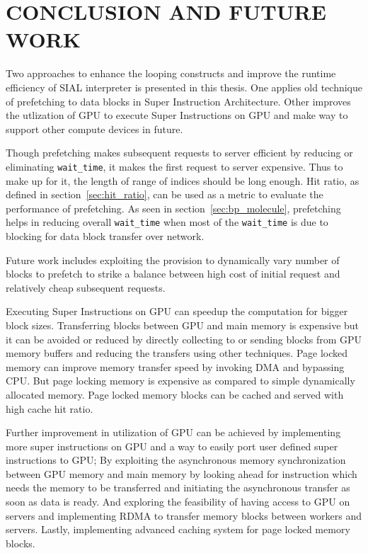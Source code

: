 \chapter{CONCLUSION AND FUTURE WORK}\label{conclusion}
Two approaches to enhance the looping constructs and improve the runtime efficiency
of SIAL interpreter is presented in this thesis. One applies old technique of
prefetching to data blocks in Super Instruction Architecture. Other improves
the utlization of GPU to execute Super Instructions on GPU and make way to support
other compute devices in future.

Though prefetching makes subsequent requests to server efficient by reducing or
eliminating \texttt{wait\_time}, it makes the first request to server expensive.
Thus to make up for it, the length of range of indices should be long enough. Hit
ratio, as defined in section~\ref{sec:hit_ratio}, can be used as a metric to evaluate
the performance of prefetching. As seen in section~\ref{sec:bp_molecule}, prefetching
helps in reducing overall \texttt{wait\_time} when most of the \texttt{wait\_time}
is due to blocking for data block transfer over network.

Future work includes exploiting the provision to dynamically vary number of blocks
to prefetch to strike a balance between high cost of initial request and relatively
cheap subsequent requests.

Executing Super Instructions on GPU can speedup the computation for bigger block
sizes. Transferring blocks between GPU and main memory is expensive but it can be
avoided or reduced by directly collecting to or sending blocks from GPU memory
buffers and reducing the transfers using other techniques. Page locked memory
can improve memory transfer speed by invoking DMA and bypassing CPU. But page locking
memory is expensive as compared to simple dynamically allocated memory. Page locked
memory blocks can be cached and served with high cache hit ratio.

Further improvement in utilization of GPU can be achieved by implementing more
super instructions on GPU and a way to easily port user defined super instructions
to GPU; By exploiting the asynchronous memory synchronization between GPU memory
and main memory by looking ahead for instruction which needs the memory
to be transferred and initiating the asynchronous transfer as soon as data is ready.
And exploring the feasibility of having access to GPU on servers and implementing
RDMA to transfer memory blocks between workers and servers. Lastly, implementing
advanced caching system for page locked memory blocks.